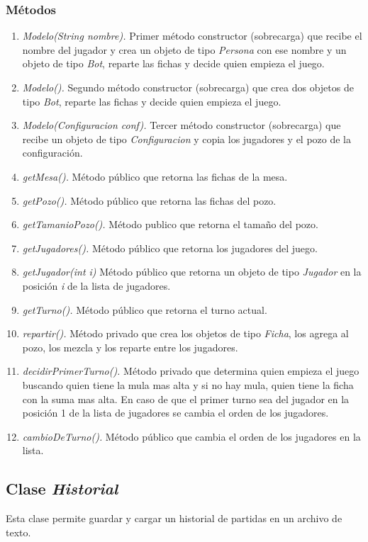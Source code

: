 \documentclass[12pt]{article}
\begin{document}
  \subsubsection{Métodos}
  \begin{enumerate}
    \item \textit{Modelo(String nombre).} Primer método constructor (sobrecarga) que recibe el nombre del jugador y crea un objeto de tipo \textit{Persona} con ese nombre y un objeto de tipo \textit{Bot}, reparte las fichas y decide quien empieza el juego.
    \item \textit{Modelo().} Segundo método constructor (sobrecarga) que crea dos objetos de tipo \textit{Bot}, reparte las fichas y decide quien empieza el juego.
    \item \textit{Modelo(Configuracion conf).} Tercer método constructor (sobrecarga) que recibe un objeto de tipo \textit{Configuracion} y copia los jugadores y el pozo de la configuración.
    \item \textit{getMesa().} Método público que retorna las fichas de la mesa.
    \item \textit{getPozo().} Método público que retorna las fichas del pozo.
    \item \textit{getTamanioPozo().} Método publico que retorna el tamaño del pozo.
    \item \textit{getJugadores().} Método público que retorna los jugadores del juego.
    \item \textit{getJugador(int i)} Método público que retorna un objeto de tipo \textit{Jugador} en la posición \textit{i} de la lista de jugadores.
    \item \textit{getTurno().} Método público que retorna el turno actual.
    \item \textit{repartir().} Método privado que crea los objetos de tipo \textit{Ficha}, los agrega al pozo, los mezcla y los reparte entre los jugadores.
    \item \textit{decidirPrimerTurno().} Método privado que determina quien empieza el juego buscando quien tiene la mula mas alta y si no hay mula, quien tiene la ficha con la suma mas alta. En caso de que el primer turno sea del jugador en la posición 1 de la lista de jugadores se cambia el orden de los jugadores.
    \item \textit{cambioDeTurno().} Método público que cambia el orden de los jugadores en la lista.
  \end{enumerate}

  \subsection{Clase \textit{Historial}}
  Esta clase permite guardar y cargar un historial de partidas en un archivo de texto.
\end{document}
